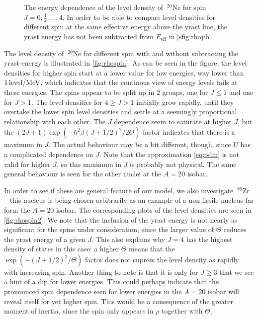 \begin{figure}
\begin{center}
\begin{tabular}{cc}
\end{tabular}
\caption{\label{fig:rhospin} The energy dependence of the level density of $~^{20}\mathrm{Ne}$ for spin $J=0,\tfrac{1}{2},\dots, 4$. In order to be able to compare level densities for different spin at the same effective energy above the yrast line, the yrast energy has not been subtracted from $E_\text{eff}$ in \ref{sfig:rhoj:b}.}
\end{center}
\end{figure}

The level density of $~^{20}\mathrm{Ne}$ for different spin with and without subtracting the yrast-energy is illustrated in \autoref{fig:rhospin}. 
As can be seen in the figure, the level densities for higher spin start at a lower value for low energies, way lower than $\unit[1]{level/MeV}$, which indicates that the continous view of energy levels fails at these energies. 
The spins appear to be split up in $2$ groups, one for $J \le 1$ and one for $J>1$.
The level densities for $4 \ge J> 1$ initially grow rapidly, until they overtake the lower spin level densities and settle at a seemingly proportional relationship with each other. The $J$ dependence seem to saturate at higher $J$, but the $(2J+1)\exp{(-\hbar^2\beta(J+1/2)^2/2\Theta)}$ factor indicates that there is a maximum in $J$. The actual behaviour may be a bit different, though, since $U$ has a complicated dependence on $J$.
Note that the approximation \eqref{eq:odm} is not valid for higher $J$, so this maximum in $J$ is probably not physical.
The same general behaviour is seen for the other nuclei at the $A=20$ isobar.

In order to see if these are general feature of our model, we also investigate $~^{99}\mathrm{Zr}$ -- this nucleus is being chosen arbitrarily as an example of a non-fissile nucleus far form the $A=20$ isobar. The corresponding plots of the level densities are seen in \autoref{fig:rhospin2}. We note that the inclusion of the yrast energy is not nearly as significant for the spins under consideration, since the larger value of $\Theta$ reduces the yrast energy of a given $J$. This also explains why $J=4$ has the highest density of states in this case: a higher $\Theta$ means that the $\exp{(-(J+1/2)^2/\Theta)}$ factor does not supress the level density as rapidly with increasing spin. 
Another thing to note is that it is only for $J\ge 3$ that we see a hint of a dip for lower energies. This could perhaps indicate that the pronounced spin dependence seen for lower energies in the $A=20$ isobar will reveal itself for yet higher spin. This would be a consequence of the greater moment of inertia, since the spin only appears in $\rho$ together with $\Theta$.

